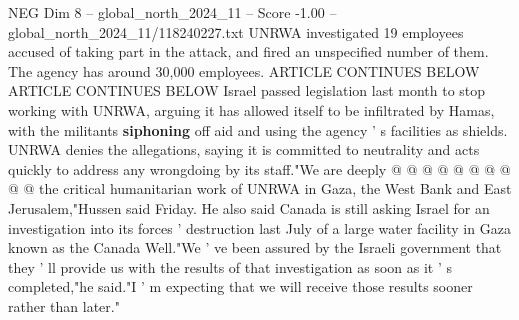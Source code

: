 \begin{textsample}{NEG Dim 8 – global\_north\_2024\_11 – Score -1.00 – global\_north\_2024\_11/118240227.txt}
UNRWA investigated 19 employees accused of taking part in the attack, and fired an unspecified number of them.
The agency has around 30,000 employees.
ARTICLE CONTINUES BELOW ARTICLE CONTINUES BELOW Israel passed legislation last month to stop working with UNRWA, arguing it has allowed itself to be infiltrated by Hamas, with the militants \textbf{siphoning} off aid and using the agency ' s facilities as shields.
UNRWA denies the allegations, saying it is committed to neutrality and acts quickly to address any wrongdoing by its staff."We are deeply @ @ @ @ @ @ @ @ @ @ the critical humanitarian work of UNRWA in Gaza, the West Bank and East Jerusalem,"Hussen said Friday.
He also said Canada is still asking Israel for an investigation into its forces ' destruction last July of a large water facility in Gaza known as the Canada Well."We ' ve been assured by the Israeli government that they ' ll provide us with the results of that investigation as soon as it ' s completed,"he said."I ' m expecting that we will receive those results sooner rather than later."

\end{textsample}
